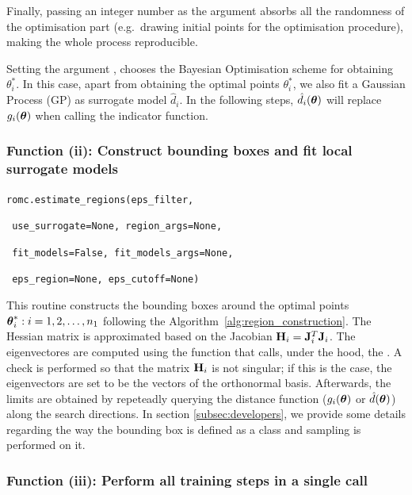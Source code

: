 Finally, passing an integer number as the argument 
absorbs all the randomness of the optimisation part (e.g.\ drawing
initial points for the optimisation procedure), making the whole
process reproducible.

Setting the argument , chooses the Bayesian
Optimisation scheme for obtaining $\theta_i^*$. In this case, apart
from obtaining the optimal points $\theta_i^*$, we also fit a Gaussian
Process (GP) as surrogate model $\hat{d}_i$. In the following steps,
$\hat{d}_i(\boldsymbol{\theta})$ will replace $g_i(\boldsymbol{\theta})$ when calling the
indicator function.

\subsubsection*{Function (ii): Construct bounding boxes and fit local surrogate models}

\texttt{romc.estimate_regions(eps_filter,}
  
      \texttt{                      use_surrogate=None, region_args=None,}
  
      \texttt{                      fit_models=False, fit_models_args=None,}
  
      \texttt{                      eps_region=None, eps_cutoff=None)}
\vspace{5mm}

This routine constructs the bounding boxes around the optimal points
$\boldsymbol{\theta}_i^* : i = 1, 2, \ldots, n_1$ following the
Algorithm~\ref{alg:region_construction}. The Hessian matrix is
approximated based on the Jacobian $\mathbf{H}_i = \mathbf{J}_i^T \mathbf{J}_i$. The
eigenvectores are computed using the function
 that calls, under the hood, the
. A check is performed so that the matrix
$\mathbf{H}_i$ is not singular; if this is the case, the eigenvectors are
set to be the vectors of the orthonormal basis. Afterwards, the limits
are obtained by repeteadly querying the distance function
($g_i(\boldsymbol{\theta})$ or $\hat{d}(\boldsymbol{\theta})$) along the search directions. In
section \ref{subsec:developers}, we provide some details regarding the
way the bounding box is defined as a class and sampling is performed
on it.

\subsubsection*{Function (iii): Perform all training steps in a single call}


